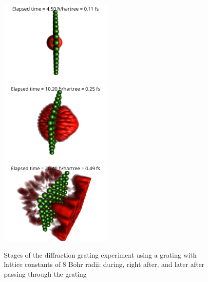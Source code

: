 \begin{figure}
	\begin{center}
		\includegraphics[width=0.5\textwidth]{figures/optical_grid_8_bohr_rad_01.png}
		\includegraphics[width=0.5\textwidth]{figures/optical_grid_8_bohr_rad_02.png}
		\includegraphics[width=0.5\textwidth]{figures/optical_grid_8_bohr_rad_03.png}
		\caption{Stages of the diffraction grating experiment using a grating with lattice constants of $8$ Bohr radii: during, right after, and later after passing through the grating}
		\label{fig:optical_grid_stages_8_bohr_radii}
	\end{center}	
\end{figure}

